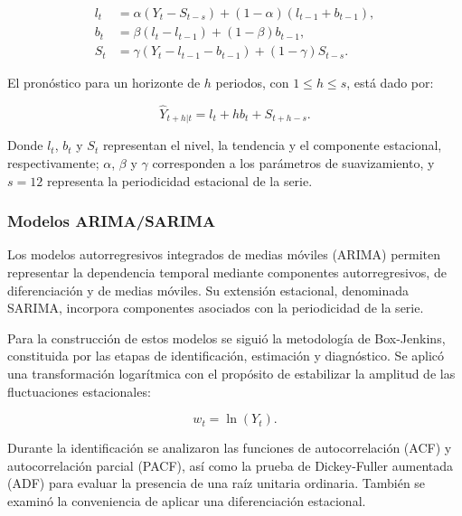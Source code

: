 \documentclass[12pt]{article}
\begin{document}
\begin{equation}
\begin{aligned}
l_t &= \alpha(Y_t-S_{t-s})+
       (1-\alpha)(l_{t-1}+b_{t-1}),\\
b_t &= \beta(l_t-l_{t-1})+(1-\beta)b_{t-1},\\
S_t &= \gamma(Y_t-l_{t-1}-b_{t-1})+
       (1-\gamma)S_{t-s}.
\end{aligned}
\label{eq:hw_componentes}
\end{equation}

El pronóstico para un horizonte de $h$ periodos, 
con $1\leq h\leq s$, está dado por:

\begin{equation}
\widehat{Y}_{t+h|t}=l_t+hb_t+S_{t+h-s}.
\label{eq:hw_pronostico}
\end{equation}

Donde $l_t$, $b_t$ y $S_t$ representan el nivel, la 
tendencia y el componente estacional, respectivamente; 
$\alpha$, $\beta$ y $\gamma$ corresponden a los 
parámetros de suavizamiento, y $s=12$ representa 
la periodicidad estacional de la serie.

\subsubsection{Modelos ARIMA/SARIMA}

Los modelos autorregresivos integrados de medias 
móviles (ARIMA) permiten representar la dependencia 
temporal mediante componentes autorregresivos, de 
diferenciación y de medias móviles. Su extensión 
estacional, denominada SARIMA, incorpora componentes 
asociados con la periodicidad de la serie.

Para la construcción de estos modelos se siguió la 
metodología de Box-Jenkins, constituida por las etapas 
de identificación, estimación y diagnóstico. Se aplicó 
una transformación logarítmica con el propósito de 
estabilizar la amplitud de las fluctuaciones 
estacionales:

\begin{equation}
w_t=\ln(Y_t).
\label{eq:transformacion_log}
\end{equation}

Durante la identificación se analizaron las funciones 
de autocorrelación (ACF) y autocorrelación parcial 
(PACF), así como la prueba de Dickey-Fuller aumentada 
(ADF) para evaluar la presencia de una raíz unitaria 
ordinaria. También se examinó la conveniencia de 
aplicar una diferenciación estacional.
\end{document}
